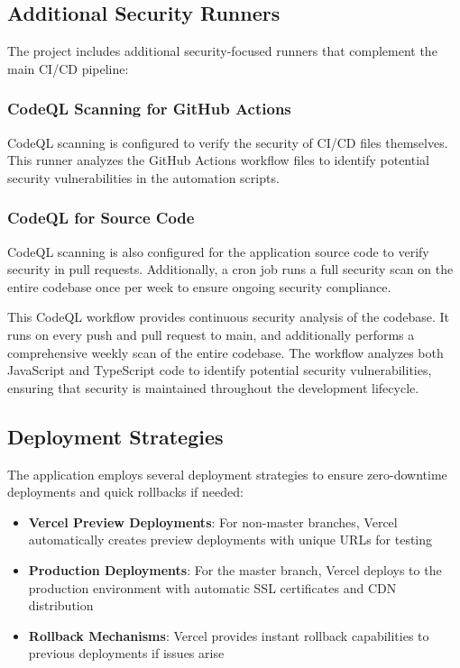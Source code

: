 \subsection{Additional Security Runners}

The project includes additional security-focused runners that complement the main CI/CD pipeline:

\subsubsection{CodeQL Scanning for GitHub Actions}

CodeQL scanning is configured to verify the security of CI/CD files themselves. This runner analyzes the GitHub Actions workflow files to identify potential security vulnerabilities in the automation scripts.

\subsubsection{CodeQL for Source Code}

CodeQL scanning is also configured for the application source code to verify security in pull requests. Additionally, a cron job runs a full security scan on the entire codebase once per week to ensure ongoing security compliance.

This CodeQL workflow provides continuous security analysis of the codebase. It runs on every push and pull request to main, and additionally performs a comprehensive weekly scan of the entire codebase. The workflow analyzes both JavaScript and TypeScript code to identify potential security vulnerabilities, ensuring that security is maintained throughout the development lifecycle.

\subsection{Deployment Strategies}

The application employs several deployment strategies to ensure zero-downtime deployments and quick rollbacks if needed:

\begin{itemize}
    \item \textbf{Vercel Preview Deployments}: For non-master branches, Vercel automatically creates preview deployments with unique URLs for testing
    \item \textbf{Production Deployments}: For the master branch, Vercel deploys to the production environment with automatic SSL certificates and CDN distribution
    \item \textbf{Rollback Mechanisms}: Vercel provides instant rollback capabilities to previous deployments if issues arise
\end{itemize}

